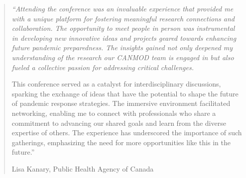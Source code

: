 \begin{quote}
{\it ``Attending the conference was an invaluable experience that provided me with a unique platform for fostering meaningful research connections and collaboration.  The opportunity to meet people in person was instrumental in developing new innovative ideas and projects geared towards enhancing future pandemic preparedness. The insights gained not only deepened my understanding of the research our CANMOD team is engaged in but also fueled a collective passion for addressing critical challenges.

This conference served as a catalyst for interdisciplinary discussions, sparking the exchange of ideas that have the potential to shape the future of pandemic response strategies. The immersive environment facilitated networking, enabling me to connect with professionals who share a commitment to advancing our shared goals and learn from the diverse expertise of others. The experience has underscored the importance of such gatherings, emphasizing the need for more opportunities like this in the future.''}

\hfill Lisa Kanary, Public Health Agency of Canada
\end{quote}